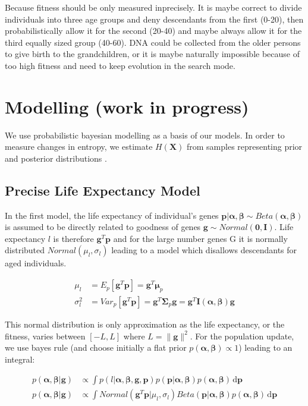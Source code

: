 \documentclass{article}
\begin{document}
Because fitness should be only measured inprecisely. It is maybe correct to divide individuals into three age groups and deny descendants from the first (0-20), then probabilistically allow it for the second (20-40) and maybe always allow it for the third equally sized group (40-60). DNA could be collected from the older persons to give birth to the grandchildren, or it is maybe naturally impossible because of too high fitness and need to keep evolution in the search mode.

\section{Modelling (work in progress)} \label{modelling}

We use probabilistic bayesian modelling  \cite{bdanalysis03} as a basis of our models. In order to measure changes in entropy, we estimate $H(\bm{X})$  from samples representing prior and posterior distributions \cite{entropy01}.


\subsection{Precise Life Expectancy Model}

In the first model, the life expectancy of individual's genes $\bm{p}|\bm{\alpha},\bm{\beta} \sim Beta(\bm{\alpha},\bm{\beta})$ is assumed to be directly related to goodness of  genes $\bm{g} \sim Normal(\bm{0}, \bm{I})$. Life expectancy $l$ is therefore $\bm{g}^T \bm{p}$ and for the large number genes G it is normally distributed $Normal(\mu_l,\sigma_l)$ leading to a model which disallows descendants for aged individuals.

\begin{equation}
\label{eq:lifeexp1}
\begin{aligned}
\mu_l &= E_p[\bm{g}^T \bm{p}] = \bm{g}^T \bm{\mu}_p \\
\sigma_l^2 &= Var_p[\bm{g}^T \bm{p}] = \bm{g}^T \bm{\Sigma}_p \bm{g} = \bm{g}^T \bm{I}(\bm{\alpha},\bm{\beta}) \bm{g}
\end{aligned}
\end{equation}

This normal distribution is only approximation as the life expectancy, or the fitness, varies between $[-L,L]$ where $L = \|\bm{g}\|^2$. For the population update, we use bayes rule (and choose initially a flat prior $p(\bm{\alpha},\bm{\beta}) \propto 1$) leading to an  integral: 

\begin{equation}
\begin{aligned}
p(\bm{\alpha},\bm{\beta}|\mathbf{g}) &\propto \int p(l|\bm{\alpha},\bm{\beta},\mathbf{g},\mathbf{p}) p(\mathbf{p}|\bm{\alpha},\bm{\beta}) p(\bm{\alpha},\bm{\beta}) \, \mathrm{d}\mathbf{p} \\ 
p(\bm{\alpha},\bm{\beta}|\bm{g}) &\propto \int Normal(\bm{g}^T \bm{p} | \mu_l, \sigma_l) Beta(\bm{p}|\bm{\alpha},\bm{\beta}) p(\bm{\alpha},\bm{\beta})  \, \mathrm{d}\bm{p}
\label{eq:bupdate2}
\end{aligned}
\end{equation}
\end{document}

